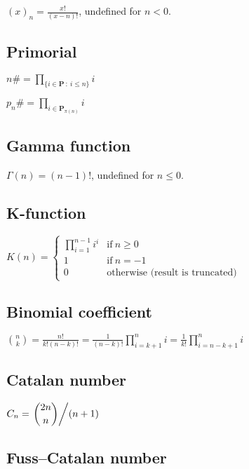 \( \displaystyle{
    (x)_n = \frac{x!}{(x - n)!}
}\), undefined for $n < 0$.


\subsection{Primorial}
\label{sec:Primorial}

\( \displaystyle{
    n\# = \prod_{\lbrace i \in \textbf{P} ~:~ i \le n \rbrace} i
}\)
\vspace{1em}

\noindent
\( \displaystyle{
    p_n\# = \prod_{i \in \textbf{P}_{\pi(n)}} i
}\)


\subsection{Gamma function}
\label{sec:Gamma function}

$\Gamma(n) = (n - 1)!$, undefined for $n \le 0$.


\subsection{K-function}
\label{sec:K-function}

\( \displaystyle{
    K(n) = \left \lbrace \begin{array}{ll}
      \displaystyle{\prod_{i = 1}^{n - 1} i^i}  & \textrm{if}~ n \ge 0 \\
      1 & \textrm{if}~ n = -1 \\
      0 & \textrm{otherwise (result is truncated)}
    \end{array} \right .
}\)


\subsection{Binomial coefficient}
\label{sec:Binomial coefficient}

\( \displaystyle{
    \binom{n}{k} = \frac{n!}{k!(n - k)!}
    = \frac{1}{(n - k)!} \prod_{i = k + 1}^n i
    = \frac{1}{k!} \prod_{i = n - k + 1}^n i
}\)


\subsection{Catalan number}
\label{sec:Catalan number}

\( \displaystyle{
    C_n = \left . \binom{2n}{n} \middle / (n + 1) \right .
}\)


\subsection{Fuss–Catalan number}
\label{sec:Fuss-Catalan number} %

